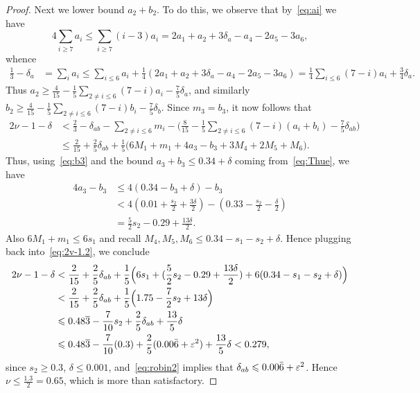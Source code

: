 \begin{proof}
  Next we lower bound $a_2+b_2$. To do this, we observe that by~\eqref{eq:ai} we have
  \[
  4\sum_{i\ge7} a_i \le \sum_{i\ge7}(i-3)a_i = 2a_1+a_2+3\delta_a -a_4-2a_5-3a_6,
  \]
  whence
  \begin{align*}
    \frac{1}{3} -\delta_a&= \sum_{i}a_i
    \le \sum_{i\le 6}a_i +\frac{1}{4}(2a_1+a_2+3\delta_a -a_4-2a_5-3a_6)
    = \frac{1}{4}\sum_{i\le 6}(7-i)a_i +\frac{3}{4}\delta_a.
  \end{align*}
  Thus $a_2 \ge \frac{4}{15} - \frac{1}{5}\sum_{2\neq i\le 6}(7-i)a_i-\frac{7}{5}\delta_a$,
  and similarly $b_2 \ge \frac{4}{15} - \frac{1}{5}\sum_{2\neq i\le 6}(7-i)b_i-\frac{7}{5}\delta_b$. Since $m_3=b_3$, it
  now follows that
  \begin{align}\label{eq:2v-1.2}
    2\nu -1-\delta
    &< \frac{2}{3}-\delta_{ab} -\sum_{2\neq i \le 6}m_i - \Big(\frac{8}{15} - \frac{1}{5}\sum_{2\neq i \le 6}(7-i)(a_i+b_i)-\frac{7}{5}\delta_{ab}\Big) \nonumber\\
    & \le \frac{2}{15} +\frac{2}{5}\delta_{ab}+ \frac{1}{5}\Big(6M_1+m_1 + 4a_3-b_3 +3M_4+2M_5+ M_6\Big).
  \end{align}
  Thus, using~\eqref{eq:b3} and the bound $a_3+b_3\leq 0.34+\delta$ coming from~\eqref{eq:Thue}, we have
  \begin{align*}
    4a_3-b_3 &\le 4(0.34-b_3+\delta)-b_3 \\
    &< 4(0.01+\frac{s_2}{2}+\frac{3\delta}{2}) - (0.33-\frac{s_2}{2}-\frac{\delta}{2})\\
    & = \frac{5}{2}s_2-0.29+\frac{13\delta}{2}.
  \end{align*}
  Also $6M_1+m_1\le 6s_1$ and recall $M_4,M_5,M_6 \le
  0.34-s_1-s_2+\delta$.
  Hence plugging back into~\eqref{eq:2v-1.2}, we conclude
  \begin{align*}
    2\nu -1-\delta
    & < \frac{2}{15}+
    \frac{2}{5}\delta_{ab}
    + \frac{1}{5}\Big(6s_1 + (\frac{5}{2}s_2-0.29+\frac{13\delta}{2})+6(0.34-s_1-s_2+\delta)\Big)\\
    & < \frac{2}{15}+
    \frac{2}{5}\delta_{ab}
    + \frac{1}{5}\Big(1.75-\frac{7}{2}s_2+13\delta\Big)\\
    & \leqslant 0.48\overline{3} - \frac{7}{10}s_2 +\frac{2}{5}\delta_{ab} +\frac{13}{5}\delta \\
    &\leqslant 0.48\overline{3} - \frac{7}{10}(0.3) +\frac{2}{5}(0.00\bar{6}+\varepsilon^2) +\frac{13}{5}\delta< 0.279,
  \end{align*}
  since $s_2\geq 0.3$, $\delta\le 0.001$, and~\eqref{eq:robin2} implies that $\delta_{ab}\leqslant 0.00\bar{6}+\varepsilon^2$.
  Hence $\nu\le \frac{1.3}{2} = 0.65$, which is more than satisfactory.
\end{proof}

